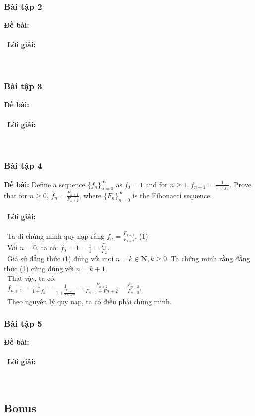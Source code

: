 \documentclass[a4paper]{article}
\begin{document}
\subsubsection{Bài tập 2}
\textbf{Đề bài:} 
\\\ \\\
\textbf{Lời giải:} \\\ \\\
\clearpage
\subsubsection{Bài tập 3}
\textbf{Đề bài:} 
\\\ \\\
\textbf{Lời giải:} \\\ \\\
\clearpage
\subsubsection{Bài tập 4}
\textbf{Đề bài: }Define a sequence $\{f_n\}_{n=0}^\infty$ as $f_0 = 1$ and for $n \geq 1$, $f_{n+1} = \frac{1}{1+f_n}$. Prove that for $n \geq 0$, $f_n = \frac{F_{n+1}}{F_{n+2}}$, where $\{F_n\}_{n=0}^\infty$ is the Fibonacci sequence. \\\ \\\
\textbf{Lời giải: } \\\ \\\
Ta đi chứng minh quy nạp rằng $f_n = \frac{F_{n+1}}{F_{n+2}}$. (1)\\\
Với $n = 0$, ta có: $f_0 = 1 = \frac{1}{1} = \frac{F_1}{F_2}$. \\\
Giả sử đẳng thức (1) đúng với mọi $n = k \in \textbf{N}, k \geq 0$.
Ta chứng minh rằng đẳng thức (1) cũng đúng với $n = k+1$.\\\
Thật vậy, ta có: \\\
$f_{n+1} = \frac{1}{1+f_n} = \frac{1}{1+\frac{F_{n+1}}{F{n+2}}} = \frac{F_{n+2}}{F_{n+1} + F{n+2}} = \frac{F_{n+2}}{F_{n+3}}$. \\\
Theo nguyên lý quy nạp, ta có điều phải chứng minh.
\clearpage
\subsubsection{Bài tập 5}
\textbf{Đề bài:} 
\\\ \\\
\textbf{Lời giải:} \\\ \\\
\clearpage

\subsection{Bonus}
\clearpage
\end{document}
